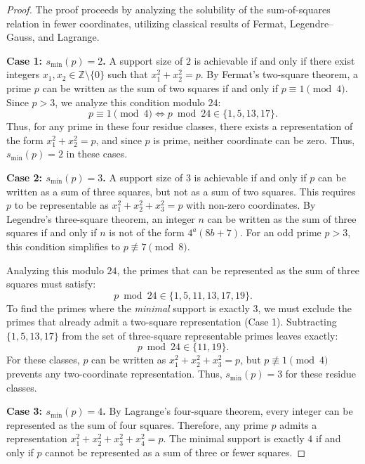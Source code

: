 \documentclass[11pt,a4paper]{article}
\theoremstyle{definition}
\begin{document}
	\begin{proof}
		The proof proceeds by analyzing the solubility of the sum-of-squares relation in fewer coordinates, utilizing classical results of Fermat, Legendre--Gauss, and Lagrange.
		
		\noindent \textbf{Case 1: $s_{\min}(p) = 2$.}
		A support size of $2$ is achievable if and only if there exist integers $x_1, x_2 \in \mathbb{Z} \setminus \{0\}$ such that $x_1^2 + x_2^2 = p$. By Fermat's two-square theorem, a prime $p$ can be written as the sum of two squares if and only if $p \equiv 1 \pmod 4$. Since $p > 3$, we analyze this condition modulo $24$:
		\begin{equation}
			p \equiv 1 \pmod 4 \iff p \bmod 24 \in \{1, 5, 13, 17\}.
		\end{equation}
		Thus, for any prime in these four residue classes, there exists a representation of the form $x_1^2 + x_2^2 = p$, and since $p$ is prime, neither coordinate can be zero. Thus, $s_{\min}(p) = 2$ in these cases.
		
		\noindent \textbf{Case 2: $s_{\min}(p) = 3$.}
		A support size of $3$ is achievable if and only if $p$ can be written as a sum of three squares, but not as a sum of two squares. This requires $p$ to be representable as $x_1^2 + x_2^2 + x_3^2 = p$ with non-zero coordinates. By Legendre's three-square theorem, an integer $n$ can be written as the sum of three squares if and only if $n$ is not of the form $4^a(8b + 7)$. For an odd prime $p > 3$, this condition simplifies to $p \not\equiv 7 \pmod 8$. 
		
		Analyzing this modulo $24$, the primes that can be represented as the sum of three squares must satisfy:
		\begin{equation}
			p \bmod 24 \in \{1, 5, 11, 13, 17, 19\}.
		\end{equation}
		To find the primes where the \emph{minimal} support is exactly $3$, we must exclude the primes that already admit a two-square representation (Case 1). Subtracting $\{1, 5, 13, 17\}$ from the set of three-square representable primes leaves exactly:
		\begin{equation}
			p \bmod 24 \in \{11, 19\}.
		\end{equation}
		For these classes, $p$ can be written as $x_1^2 + x_2^2 + x_3^2 = p$, but $p \not\equiv 1 \pmod 4$ prevents any two-coordinate representation. Thus, $s_{\min}(p) = 3$ for these residue classes.
		
		\noindent \textbf{Case 3: $s_{\min}(p) = 4$.}
		By Lagrange's four-square theorem, every integer can be represented as the sum of four squares. Therefore, any prime $p$ admits a representation $x_1^2 + x_2^2 + x_3^2 + x_4^2 = p$. The minimal support is exactly $4$ if and only if $p$ cannot be represented as a sum of three or fewer squares. 
		

\end{proof}
\end{document}

